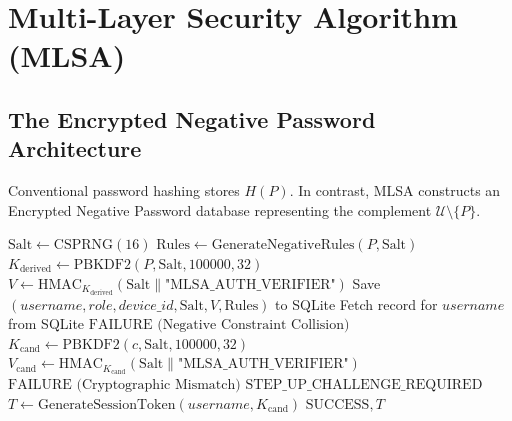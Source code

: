 \documentclass[12pt,a4paper]{report}
\begin{document}
\chapter{Multi-Layer Security Algorithm (MLSA)}

\section{The Encrypted Negative Password Architecture}
Conventional password hashing stores $H(P)$. In contrast, MLSA constructs an Encrypted Negative Password database representing the complement $\mathcal{U} \setminus \{P\}$.

\begin{algorithm}[htbp]
\caption{MLSA Registration and Authentication}
\label{alg:mlsa}
\begin{algorithmic}[1]
    \State $\text{Salt} \gets \text{CSPRNG}(16)$
    \State $\text{Rules} \gets \text{GenerateNegativeRules}(P, \text{Salt})$ 
    \State $K_{\text{derived}} \gets \text{PBKDF2}(P, \text{Salt}, 100000, 32)$
    \State $V \gets \text{HMAC}_{K_{\text{derived}}}(\text{Salt} \parallel \text{"MLSA\_AUTH\_VERIFIER"})$
    \State Save $(username, role, device\_id, \text{Salt}, V, \text{Rules})$ to SQLite
\EndProcedure
\Statex
{}
    \State Fetch record for $username$ from SQLite
            \State \Return $\text{FAILURE (Negative Constraint Collision)}$
        \EndIf
    \EndFor
    \State $K_{\text{cand}} \gets \text{PBKDF2}(c, \text{Salt}, 100000, 32)$
    \State $V_{\text{cand}} \gets \text{HMAC}_{K_{\text{cand}}}(\text{Salt} \parallel \text{"MLSA\_AUTH\_VERIFIER"})$
        \State \Return $\text{FAILURE (Cryptographic Mismatch)}$
    \EndIf
        \State \Return $\text{STEP\_UP\_CHALLENGE\_REQUIRED}$
    \EndIf
    \State $T \gets \text{GenerateSessionToken}(username, K_{\text{cand}})$
    \State \Return $\text{SUCCESS}, T$
\EndProcedure
\end{algorithmic}
\end{algorithm}
\end{document}
